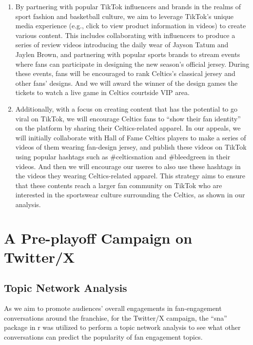 \documentclass[
]{book}
\begin{document}
\begin{enumerate}
\def\labelenumi{\arabic{enumi})}
\item
  By partnering with popular TikTok influencers and brands in the realms of sport fashion and basketball culture, we aim to leverage TikTok's unique media experience (e.g., click to view product information in videos) to create various content. This includes collaborating with influencers to produce a series of review videos introducing the daily wear of Jayson Tatum and Jaylen Brown, and partnering with popular sports brands to stream events where fans can participate in designing the new season's official jersey. During these events, fans will be encouraged to rank Celtics's classical jersey and other fans' designs. And we will award the winner of the design games the tickets to watch a live game in Celtics courtside VIP area.
\item
  Additionally, with a focus on creating content that has the potential to go viral on TikTok, we will encourage Celtics fans to ``show their fan identity'' on the platform by sharing their Celtics-related apparel. In our appeals, we will initially collaborate with Hall of Fame Celtics players to make a series of videos of them wearing fan-design jersey, and publish these videos on TikTok using popular hashtags such as \#celticsnation and \#bleedgreen in their videos. And then we will encourage our useres to also use these hashtags in the videos they wearing Celtics-related apparel. This strategy aims to ensure that these contents reach a larger fan community on TikTok who are interested in the sportswear culture surrounding the Celtics, as shown in our analysis.
\end{enumerate}

\hypertarget{a-pre-playoff-campaign-on-twitterx}{%
\section{A Pre-playoff Campaign on Twitter/X}\label{a-pre-playoff-campaign-on-twitterx}}

\hypertarget{topic-network-analysis}{%
\subsection{Topic Network Analysis}\label{topic-network-analysis}}

As we aim to promote audiences' overall engagements in fan-engagement conversations around the franchise, for the Twitter/X campaign, the ``sna'' package in r was utilized to perform a topic network analysis to see what other conversations can predict the popularity of fan engagement topics.
\end{document}
